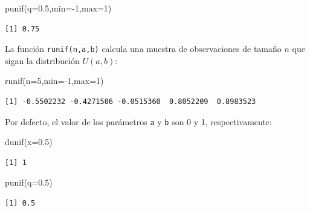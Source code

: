 \documentclass[
  letterpaper,
  DIV=11,
  numbers=noendperiod]{scrreprt}
\newenvironment{Shaded}{\begin{snugshade}}{\end{snugshade}}
\newcommand{\AttributeTok}[1]{\textcolor[rgb]{0.40,0.45,0.13}{#1}}
\newcommand{\DecValTok}[1]{\textcolor[rgb]{0.68,0.00,0.00}{#1}}
\newcommand{\FloatTok}[1]{\textcolor[rgb]{0.68,0.00,0.00}{#1}}
\newcommand{\FunctionTok}[1]{\textcolor[rgb]{0.28,0.35,0.67}{#1}}
\newcommand{\NormalTok}[1]{\textcolor[rgb]{0.00,0.23,0.31}{#1}}
\newcommand{\SpecialCharTok}[1]{\textcolor[rgb]{0.37,0.37,0.37}{#1}}
\begin{document}
\begin{Shaded}
\begin{Highlighting}[]
\FunctionTok{punif}\NormalTok{(}\AttributeTok{q=}\FloatTok{0.5}\NormalTok{,}\AttributeTok{min=}\SpecialCharTok{{-}}\DecValTok{1}\NormalTok{,}\AttributeTok{max=}\DecValTok{1}\NormalTok{)}
\end{Highlighting}
\end{Shaded}

\begin{verbatim}
[1] 0.75
\end{verbatim}

La función \texttt{runif(n,a,b)} calcula una muestra de observaciones de
tamaño \(n\) que sigan la distribución \(U(a,b)\):

\begin{Shaded}
\begin{Highlighting}[]
\FunctionTok{runif}\NormalTok{(}\AttributeTok{n=}\DecValTok{5}\NormalTok{,}\AttributeTok{min=}\SpecialCharTok{{-}}\DecValTok{1}\NormalTok{,}\AttributeTok{max=}\DecValTok{1}\NormalTok{)}
\end{Highlighting}
\end{Shaded}

\begin{verbatim}
[1] -0.5502232 -0.4271506 -0.0515360  0.8052209  0.8983523
\end{verbatim}

Por defecto, el valor de los parámetros \texttt{a} y \texttt{b} son 0 y
1, respectivamente:

\begin{Shaded}
\begin{Highlighting}[]
\FunctionTok{dunif}\NormalTok{(}\AttributeTok{x=}\FloatTok{0.5}\NormalTok{)}
\end{Highlighting}
\end{Shaded}

\begin{verbatim}
[1] 1
\end{verbatim}

\begin{Shaded}
\begin{Highlighting}[]
\FunctionTok{punif}\NormalTok{(}\AttributeTok{q=}\FloatTok{0.5}\NormalTok{)}
\end{Highlighting}
\end{Shaded}

\begin{verbatim}
[1] 0.5
\end{verbatim}
\end{document}
